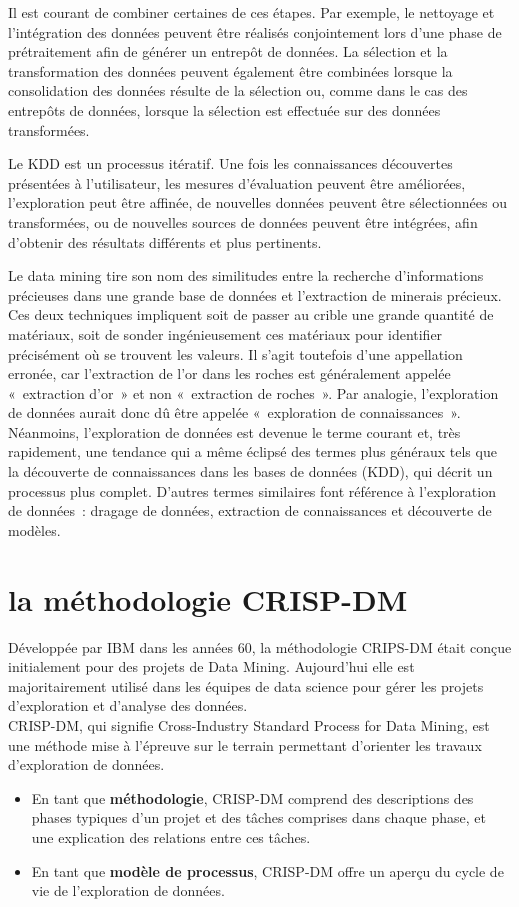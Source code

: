\documentclass[a4paper,12pt]{report}
\begin{document}
        Il est courant de combiner certaines de ces étapes. Par exemple, le nettoyage et l'intégration des données peuvent être réalisés conjointement lors d'une phase de prétraitement afin de générer un entrepôt de données. La sélection et la transformation des données peuvent également être combinées lorsque la consolidation des données résulte de la sélection ou, comme dans le cas des entrepôts de données, lorsque la sélection est effectuée sur des données transformées.

        Le KDD est un processus itératif. Une fois les connaissances découvertes présentées à l'utilisateur, les mesures d'évaluation peuvent être améliorées, l'exploration peut être affinée, de nouvelles données peuvent être sélectionnées ou transformées, ou de nouvelles sources de données peuvent être intégrées, afin d'obtenir des résultats différents et plus pertinents.

        Le data mining tire son nom des similitudes entre la recherche d'informations précieuses dans une grande base de données et l'extraction de minerais précieux. Ces deux techniques impliquent soit de passer au crible une grande quantité de matériaux, soit de sonder ingénieusement ces matériaux pour identifier précisément où se trouvent les valeurs. Il s'agit toutefois d'une appellation erronée, car l'extraction de l'or dans les roches est généralement appelée « extraction d'or » et non « extraction de roches ». Par analogie, l'exploration de données aurait donc dû être appelée « exploration de connaissances ». Néanmoins, l'exploration de données est devenue le terme courant et, très rapidement, une tendance qui a même éclipsé des termes plus généraux tels que la découverte de connaissances dans les bases de données (KDD), qui décrit un processus plus complet. D'autres termes similaires font référence à l'exploration de données : dragage de données, extraction de connaissances et découverte de modèles.

    \section{la méthodologie CRISP-DM}
        Développée par IBM dans les années 60, la méthodologie CRIPS-DM était conçue initialement pour des projets de Data Mining. Aujourd'hui elle est majoritairement utilisé dans les équipes de data science pour gérer les projets d’exploration et d’analyse des données.\\
        CRISP-DM, qui signifie Cross-Industry Standard Process for Data Mining, est une méthode mise à l'épreuve sur le terrain permettant d'orienter les travaux d'exploration de données.
        \begin{itemize}
            \item En tant que \textbf{méthodologie}, CRISP-DM comprend des descriptions des phases typiques d'un projet et des tâches comprises dans chaque phase, et une explication des relations entre ces tâches.
            \item En tant que \textbf{modèle de processus}, CRISP-DM offre un aperçu du cycle de vie de l'exploration de données.
        \end{itemize}
        
\end{document}
